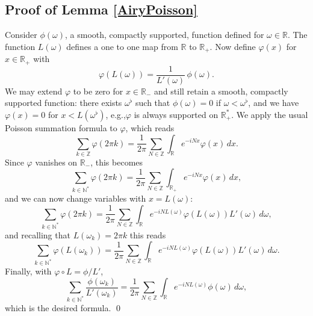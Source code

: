 \documentclass[11pt]{article}
\providecommand{\backmatter}{}
\newcommand{\eg}{e.g.,\xspace}
\newcommand\N{{\mathbb N}}
\newcommand\R{{\mathbb R}}
\newcommand\Z{{\mathbb Z}}
\theoremstyle{plain}
\theoremstyle{definition}
\begin{document}
\subsection{Proof of Lemma \ref{AiryPoisson}}
Consider $\phi(\omega)$, a smooth, compactly supported, function defined for $\omega \in \R$. The function $L(\omega)$ defines a one to one map from $\R$ to $\R_{+}$. Now define $\varphi(x)$ for $x\in \R_{+}$ with\vspace*{-3pt}
\[
\varphi(L(\omega))=\frac 1 {L'(\omega)}\, \phi (\omega).
\]
We may extend $\varphi$ to be zero for $x\in \R_{-}$ and still retain a smooth, compactly supported function: there exists $\omega^{\flat}$ such that $\phi(\omega)=0$ if $\omega<\omega^{\flat}$, and we have $\varphi(x)=0$ for $x<L(\omega^{\flat})$, \eg $\varphi$ is always supported on $\R_{+}^{*}$. We apply the usual Poisson summation formula to $\varphi$, which reads\vspace*{-3pt}
\[
\sum_{k\in \Z} \varphi(2\pi k)=\frac 1 {2\pi} \sum_{N\in \Z} \int_{\R} e^{-i N x}\varphi(x)\,dx.
\]
Since $\varphi$ vanishes on $\R_{-}$, this becomes\vspace*{-3pt}
\[
\sum_{k\in \N^{*}} \varphi(2\pi k)=\frac 1 {2\pi} \sum_{N\in \Z} \int_{\R_{+}} e^{-i N x}\varphi(x)\,dx,
\]
and we can now change variables with $x=L(\omega)$:\vspace*{-3pt}
\[
\sum_{k\in \N^{*}} \varphi(2\pi k)=\frac 1 {2\pi} \sum_{N\in \Z} \int_{\R} e^{-i N L(\omega)}\varphi(L(\omega))L'(\omega)\,d\omega,
\]
and recalling that $L(\omega_{k})=2\pi k$ this reads\vspace*{-3pt}
\[
\sum_{k\in \N^{*}} \varphi(L(\omega_{k}))=\frac 1 {2\pi} \sum_{N\in \Z} \int_{\R} e^{-i N L(\omega)}\varphi(L(\omega))L'(\omega)\,d\omega.
\]
Finally, with $\varphi\circ L=\phi/L'$,\vspace*{-3pt}\enlargethispage{\baselineskip}%
\[
\sum_{k\in \N^{*}} \frac {\phi(\omega_{k})}{L'(\omega_{k})}=\frac 1 {2\pi} \sum_{N\in \Z} \int_{\R} e^{-i N L(\omega)}\phi(\omega)\,d\omega,
\]
which is the desired formula. \qed

\backmatter

\end{document}

